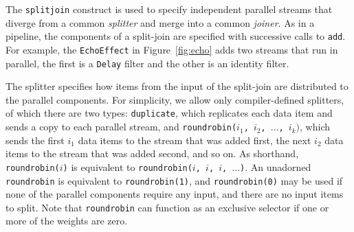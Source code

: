 
The  \texttt{splitjoin}  construct  is  used  to  specify  independent
parallel streams that diverge  from a common \emph{splitter} and merge
into a  common \emph{joiner}.  As in  a pipeline, the  components of a
split-join are  specified with successive calls  to \texttt{add}.  For
example,  the \texttt{EchoEffect}  in  Figure~\ref{fig:echo} adds  two
streams that run in parallel, the first is a \texttt{Delay} filter and
the other is an identity filter.

The splitter specifies how items  from the input of the split-join are
distributed to the parallel components.  For simplicity, we allow only
compiler-defined splitters, of which there are two types:
\texttt{duplicate}, which replicates each data item and sends a copy
to each parallel stream, and \texttt{roundrobin($i_1$, $i_2$, $\dots$,
$i_k)$}, which sends the first $i_1$ data items to the stream that was
added first,  the next $i_2$ data  items to the stream  that was added
second,  and   so  on.   As   shorthand,  \texttt{roundrobin($i$)}  is
equivalent  to   \texttt{roundrobin($i$,  $i$,  $i$,   $\dots$)}.   An
unadorned \texttt{roundrobin} is equivalent to \texttt{roundrobin(1)},
and  \texttt{roundrobin(0)}  may  be  used  if none  of  the  parallel
components require any  input, and there are no  input items to split.
Note that \texttt{roundrobin} can function as an exclusive selector if
one or more of the weights are zero.


